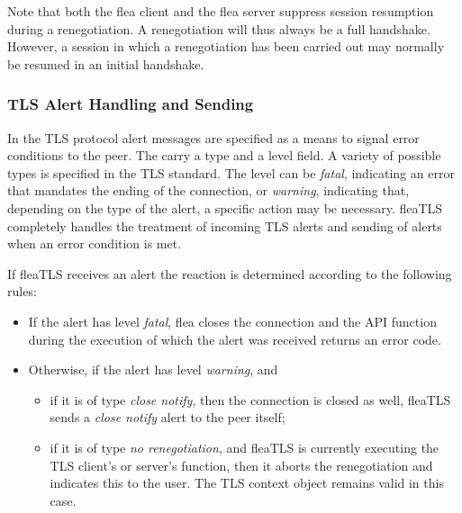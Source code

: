 \documentclass[a4paper,11pt]{scrartcl}
\begin{document}
  Note that both the flea client and the flea server suppress session resumption
  during a renegotiation. A renegotiation will thus always be a full handshake.
  However, a session in which a renegotiation has been carried out may normally
  be resumed in an initial handshake.
  

  \subsubsection{TLS Alert Handling and Sending }

  In the TLS protocol alert messages are specified as a means to signal error
  conditions to the peer. The carry a type and a level field. A variety of possible types
  is specified in the TLS standard. The level can be \emph{fatal}, indicating an error
  that mandates the ending of the connection, or \emph{warning}, indicating that,
  depending on the type of the alert, a specific action may be necessary.
  fleaTLS completely handles the treatment of incoming
  TLS alerts and sending of alerts when an error condition is met.

  If fleaTLS receives an alert the reaction is determined according to the
  following rules:
  \begin{itemize}
    \item If the alert has level \emph{fatal}, flea closes the connection and the API
        function during the execution of which the alert was received returns an
        error code.
      \item Otherwise, if the alert has level \emph{warning}, and
        \begin{itemize}
          \item if it is of type \emph{close notify}, then the connection is closed as
            well, \ie fleaTLS sends a \emph{close notify} alert to the peer itself;
          \item if it is of type \emph{no renegotiation}, and fleaTLS is
            currently executing the TLS client's or server's
             function, then it aborts the renegotiation and
            indicates this to the user. The TLS context object remains valid in
            this case.

  \end{itemize}
  \end{itemize}
\end{document}
